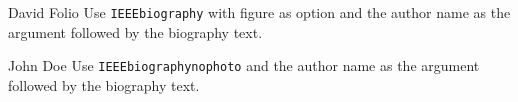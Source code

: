 \documentclass[
  journal,
]{IEEEtran}%
\theoremstyle{plain}
\theoremstyle{remark}
\providecommand{\bibfont}{\footnotesize}
\begin{document}
\ifCLASSOPTIONcaptionsoff
  \newpage
\fi



\pagebreak[3]
\begin{IEEEbiography}{David Folio}
Use \texttt{IEEEbiography} with figure as option and the author name as
the argument followed by the biography text.
\end{IEEEbiography}
\begin{IEEEbiographynophoto}{John Doe}
Use \texttt{IEEEbiographynophoto} and the author name as the argument
followed by the biography text.
\end{IEEEbiographynophoto}
\end{document}
